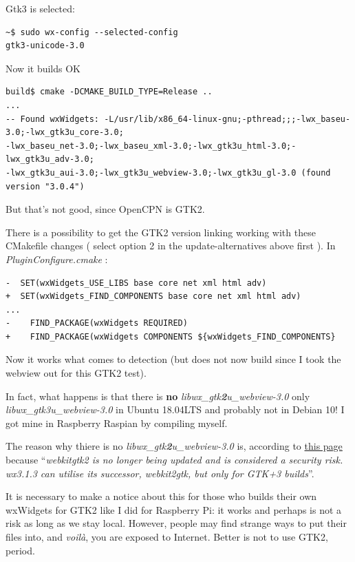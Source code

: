 \documentclass[11pt]{article}
\begin{document}
    Gtk3 is selected:

    \begin{verbatim}
~$ sudo wx-config --selected-config
gtk3-unicode-3.0
\end{verbatim}

    Now it builds OK

    \begin{verbatim}
build$ cmake -DCMAKE_BUILD_TYPE=Release ..
...
-- Found wxWidgets: -L/usr/lib/x86_64-linux-gnu;-pthread;;;-lwx_baseu-3.0;-lwx_gtk3u_core-3.0;
-lwx_baseu_net-3.0;-lwx_baseu_xml-3.0;-lwx_gtk3u_html-3.0;-lwx_gtk3u_adv-3.0;
-lwx_gtk3u_aui-3.0;-lwx_gtk3u_webview-3.0;-lwx_gtk3u_gl-3.0 (found version "3.0.4")
\end{verbatim}

    But that's not good, since OpenCPN is GTK2.

    There is a possibility to get the GTK2 version linking working with
these CMakefile changes ( select option 2 in the update-alternatives
above first ). In \emph{PluginConfigure.cmake} :

    \begin{verbatim}
-  SET(wxWidgets_USE_LIBS base core net xml html adv)
+  SET(wxWidgets_FIND_COMPONENTS base core net xml html adv)
...
-    FIND_PACKAGE(wxWidgets REQUIRED)
+    FIND_PACKAGE(wxWidgets COMPONENTS ${wxWidgets_FIND_COMPONENTS}
\end{verbatim}

    Now it works what comes to detection (but does not now build since I
took the webview out for this GTK2 test).

    In fact, what happens is that there is \textbf{no}
\emph{libwx\_gtk\textbf{2}u\_webview-3.0} only
\emph{libwx\_gtk3u\_webview-3.0} in Ubuntu 18.04LTS and probably not in
Debian 10! I got mine in Raspberry Raspian by compiling myself.

    The reason why thiere is no \emph{libwx\_gtk\textbf{2}u\_webview-3.0}
is, according to
\href{https://wiki.codelite.org/pmwiki.php/Main/WxWidgets31Binaries\#toc2}{this
page} because ``\emph{webkitgtk2 is no longer being updated and is
considered a security risk. wx3.1.3 can utilise its successor,
webkit2gtk, but only for GTK+3 builds}''.

    It is necessary to make a notice about this for those who builds their
own wxWidgets for GTK2 like I did for Raspberry Pi: it works and perhaps
is not a risk as long as we stay local. However, people may find strange
ways to put their files into, and \emph{voilà}, you are exposed to
Internet. Better is not to use GTK2, period.
\end{document}
